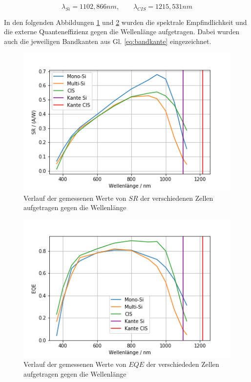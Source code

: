 \begin{equation}
\lambda_{Si} = 1102,866 nm, \qquad \lambda_{CIS} = 1215,531 nm
\label{eq:bandkante}
\end{equation}

In den folgenden Abbildungen \ref{bild:SRall} und \ref{bild:allEQE} wurden die spektrale Empfindlichkeit und die externe 
Quanteneffizienz gegen die Wellenlänge aufgetragen.
Dabei wurden auch die jeweiligen Bandkanten aus Gl. \ref{eq:bandkante} eingezeichnet.

\begin{figure}[h]
    \centering
    \includegraphics[scale=0.75]{Bilder/32allSRverb.png}
    \caption{Verlauf der gemessenen Werte von $SR$ der verschiedenen Zellen aufgetragen gegen die Wellenlänge}
    \label{bild:SRall}
\end{figure}


\begin{figure}[ht]
    \centering
    \includegraphics[scale=0.75]{Bilder/32allEQEverb.png}
    \caption{Verlauf der gemessenen Werte von $EQE$ der verschiededen Zellen aufgetragen gegen die Wellenlänge}
    \label{bild:allEQE}
\end{figure}

